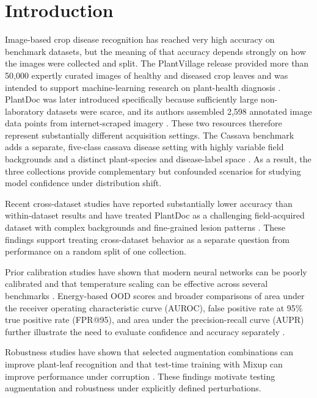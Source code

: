 \documentclass{sbc2023}%
\begin{document}
\section{Introduction}\label{sec:intro}
Image-based crop disease recognition has reached very high accuracy on benchmark datasets, but the meaning of that accuracy depends strongly on how the images were collected and split. The PlantVillage release provided more than 50,000 expertly curated images of healthy and diseased crop leaves and was intended to support machine-learning research on plant-health diagnosis \cite{r01}. PlantDoc was later introduced specifically because sufficiently large non-laboratory datasets were scarce, and its authors assembled 2,598 annotated image data points from internet-scraped imagery \cite{r02}. These two resources therefore represent substantially different acquisition settings. The Cassava benchmark adds a separate, five-class cassava disease setting with highly variable field backgrounds and a distinct plant-species and disease-label space \cite{r03}. As a result, the three collections provide complementary but confounded scenarios for studying model confidence under distribution shift.

Recent cross-dataset studies have reported substantially lower accuracy than within-dataset results and have treated PlantDoc as a challenging field-acquired dataset with complex backgrounds and fine-grained lesion patterns \cite{r39,r14}. These findings support treating cross-dataset behavior as a separate question from performance on a random split of one collection.

Prior calibration studies have shown that modern neural networks can be poorly calibrated and that temperature scaling can be effective across several benchmarks \cite{r04}. Energy-based OOD scores and broader comparisons of area under the receiver operating characteristic curve (AUROC), false positive rate at 95\% true positive rate (FPR@95), and area under the precision-recall curve (AUPR) further illustrate the need to evaluate confidence and accuracy separately \cite{r05,r42}.

Robustness studies have shown that selected augmentation combinations can improve plant-leaf recognition and that test-time training with Mixup can improve performance under corruption \cite{r06,r11}. These findings motivate testing augmentation and robustness under explicitly defined perturbations.
\end{document}
